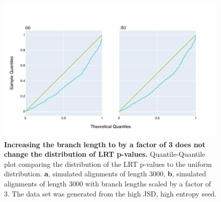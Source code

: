 \begin{figure}[!ht]
\centering
\includegraphics[width=\textwidth]{figures/plots/synthetic/lrt/197113_332182_17210-long_branch.pdf}
\caption{\textbf{Increasing the branch length to by a factor of 3 does not change the distribution of LRT p-values.} Quantile-Quantile plot comparing the distribution of the LRT p-values to the uniform distribution. \textbf{a}, simulated alignments of length 3000, \textbf{b}, simulated alignments of length 3000 with branch lengths scaled by a factor of 3. The data set was generated from the high JSD, high entropy seed.}
\label{fig:synthetic/lrt/197113-long_branch}
\end{figure}